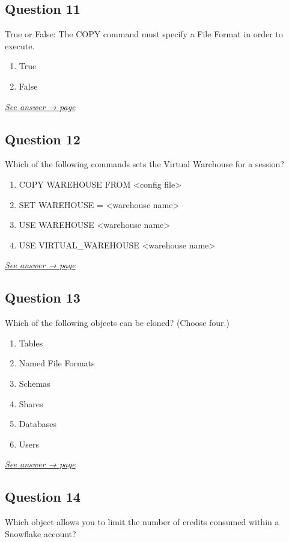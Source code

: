 \documentclass[12pt]{article}
\newcommand{\seeanswer}[1]{%
  \par\smallskip\emph{\hyperref[ans:#1]{See answer → page \pageref{ans:#1}}}%
}
\begin{document}
\subsection*{Question 11}\label{q:11}
True or False: The COPY command must specify a File Format in order to execute.

\begin{enumerate}[label=\Alph*.]
  \item True
  \item False
\end{enumerate}
\seeanswer{11}

\subsection*{Question 12}\label{q:12}
Which of the following commands sets the Virtual Warehouse for a session?

\begin{enumerate}[label=\Alph*.]
  \item COPY WAREHOUSE FROM \textless config file\textgreater
  \item SET WAREHOUSE = \textless warehouse name\textgreater
  \item USE WAREHOUSE \textless warehouse name\textgreater
  \item USE VIRTUAL\_WAREHOUSE \textless warehouse name\textgreater
\end{enumerate}
\seeanswer{12}

\subsection*{Question 13}\label{q:13}
Which of the following objects can be cloned? (Choose four.)

\begin{enumerate}[label=\Alph*.]
  \item Tables
  \item Named File Formats
  \item Schemas
  \item Shares
  \item Databases
  \item Users
\end{enumerate}
\seeanswer{13}

\subsection*{Question 14}\label{q:14}
Which object allows you to limit the number of credits consumed within a Snowflake account?
\end{document}
